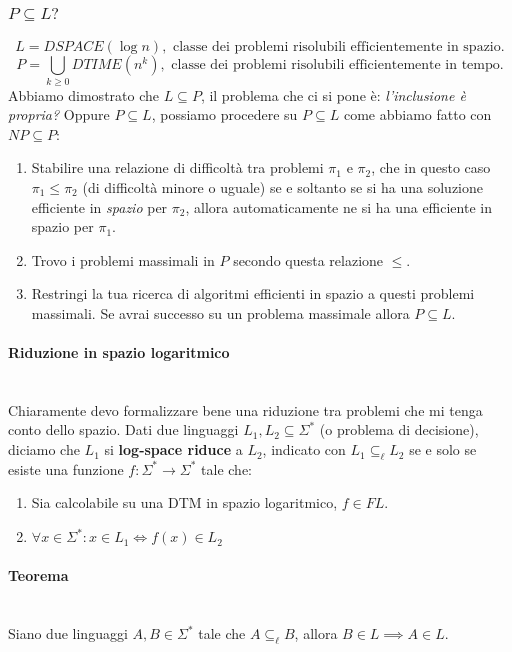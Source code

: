 \documentclass{article}
\begin{document}
\subsubsection{$P\subseteq L?$}
$$L=DSPACE(\log n),\text{ classe dei problemi risolubili efficientemente in spazio.}$$
$$P=\bigcup_{k\geq 0}DTIME(n^k),\text{ classe dei problemi risolubili efficientemente in tempo.}$$
Abbiamo dimostrato che $L\subseteq P$, il problema che ci si pone è:\textit{ l'inclusione
    è propria?} Oppure $P\subseteq L$, possiamo procedere su $P\subseteq L$ come abbiamo
fatto con $NP\subseteq P$:
\begin{enumerate}
    \item Stabilire una relazione di difficoltà tra problemi $\pi_1$ e $\pi_2$, che in questo
          caso $\pi_1\leq\pi_2$ (di difficoltà minore o uguale) se e soltanto se si ha una
          soluzione efficiente in \textit{spazio} per $\pi_2$, allora automaticamente ne si ha
          una efficiente in spazio per $\pi_1$.

    \item Trovo i problemi massimali in $P$ secondo questa relazione $\leq$.

    \item Restringi la tua ricerca di algoritmi efficienti in spazio a questi problemi
          massimali. Se avrai successo su un problema massimale allora $P\subseteq L$.
\end{enumerate}

\paragraph{Riduzione in spazio logaritmico}\mbox{}\\
Chiaramente devo formalizzare bene una riduzione tra problemi che mi tenga conto dello spazio.
Dati due linguaggi $L_1,L_2\subseteq\Sigma^*$ (o problema di decisione), diciamo che
$L_1$ si \textbf{log-space riduce} a $L_2$, indicato con $L_1\subseteq_{\ell}L_2$ se e solo se
esiste una funzione $f:\Sigma^*\rightarrow\Sigma^*$ tale che:
\begin{enumerate}
    \item Sia calcolabile su una DTM in spazio logaritmico, $f\in FL$.
    \item $\forall x\in\Sigma^*:x\in L_1\Leftrightarrow f(x)\in L_2$
\end{enumerate}
\paragraph{Teorema}\mbox{}\\
Siano due linguaggi $A,B\in\Sigma^*$ tale che $A\subseteq_{\ell}B$, allora $B\in L\implies A\in L$.
\end{document}
